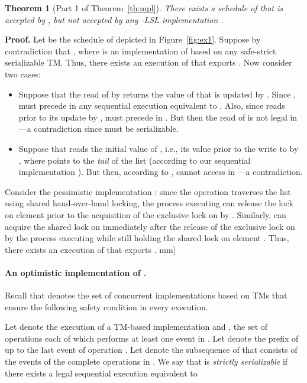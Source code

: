 \documentclass[11pt,pdftex,letterpaper]{article}
\newtheorem{theorem}{Theorem}
\newenvironment{proof}[1][Proof]{\noindent\textbf{#1.} }{\hfill \2mm]}
\begin{document}
\begin{theorem}[Part 1 of  Theorem~\ref{th:mpl}]
There exists a schedule  of  that is
accepted by , but not accepted by \emph{any}
-LSL implementation .
\end{theorem}
\begin{proof}
Let  be the schedule of  depicted in Figure~\ref{fig:ex1}.
Suppose by contradiction that , where  is an implementation of  based on any safe-strict serializable TM.
Thus, there exists an execution  of  that exports .
Now consider two cases:
\begin{itemize}
\item
Suppose that the read of  by  
returns the value of  that is updated by .
Since , 
 must precede  in any sequential execution  equivalent to . 
Also, since  reads  prior to its update by , 
 must precede  in . 
But then the read of  is not legal in ---a contradiction since  must be serializable.
\item
Suppose that 
reads the initial value of , i.e., its value prior to the write to  by , 
where  points to the
\emph{tail} of the list (according to our sequential implementation ).
But then, according to ,  cannot access
 in ---a contradiction.  
\end{itemize}
Consider the pessimistic implementation :
since the  operation traverses the list using shared hand-over-hand locking, 
the process  executing 
can release the lock on element  prior to the acquisition of the exclusive lock on  by .
Similarly,  can acquire the shared lock on  immediately after the release of the 
exclusive lock on  by the process executing  while still holding 
the shared lock on element . Thus, there exists an execution of  that exports .
\end{proof}\paragraph{An optimistic implementation  of .}
Recall that  denotes the set of concurrent implementations based on TMs
that ensure the following safety condition in every execution.

Let  denote the execution of a TM-based implementation and
, 
the set of operations each of which performs at least one event in .
Let  denote the prefix of  up to the last event of operation .
Let  denote the subsequence of   that
consists of the events of the complete operations in . 
We say that  is \emph{strictly serializable} if 
there exists a legal sequential execution  equivalent to
\end{document}
